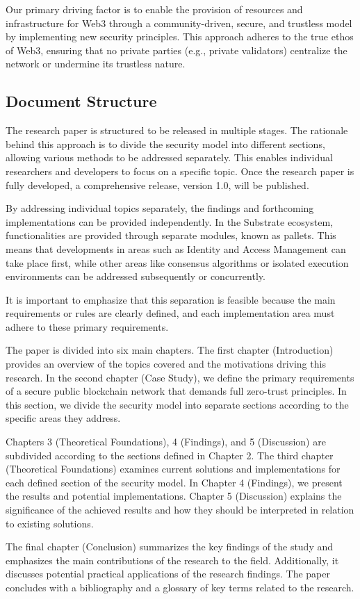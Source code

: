 Our primary driving factor is to enable the provision of resources and infrastructure for Web3 through a community-driven, secure, and trustless model by implementing new security principles. This approach adheres to the true ethos of Web3, ensuring that no private parties (e.g., private validators) centralize the network or undermine its trustless nature.   

\subsection{Document Structure}
The research paper is structured to be released in multiple stages. The rationale behind this approach is to divide the security model into different sections, allowing various methods to be addressed separately. This enables individual researchers and developers to focus on a specific topic. Once the research paper is fully developed, a comprehensive release, version 1.0, will be published.

By addressing individual topics separately, the findings and forthcoming implementations can be provided independently. In the Substrate ecosystem, functionalities are provided through separate modules, known as pallets. This means that developments in areas such as Identity and Access Management can take place first, while other areas like consensus algorithms or isolated execution environments can be addressed subsequently or concurrently.

It is important to emphasize that this separation is feasible because the main requirements or rules are clearly defined, and each implementation area must adhere to these primary requirements.

The paper is divided into six main chapters. The first chapter (Introduction) provides an overview of the topics covered and the motivations driving this research. In the second chapter (Case Study), we define the primary requirements of a secure public blockchain network that demands full zero-trust principles. In this section, we divide the security model into separate sections according to the specific areas they address.

Chapters 3 (Theoretical Foundations), 4 (Findings), and 5 (Discussion) are subdivided according to the sections defined in Chapter 2. The third chapter (Theoretical Foundations) examines current solutions and implementations for each defined section of the security model. In Chapter 4 (Findings), we present the results and potential implementations. Chapter 5 (Discussion) explains the significance of the achieved results and how they should be interpreted in relation to existing solutions.

The final chapter (Conclusion) summarizes the key findings of the study and emphasizes the main contributions of the research to the field. Additionally, it discusses potential practical applications of the research findings. The paper concludes with a bibliography and a glossary of key terms related to the research.